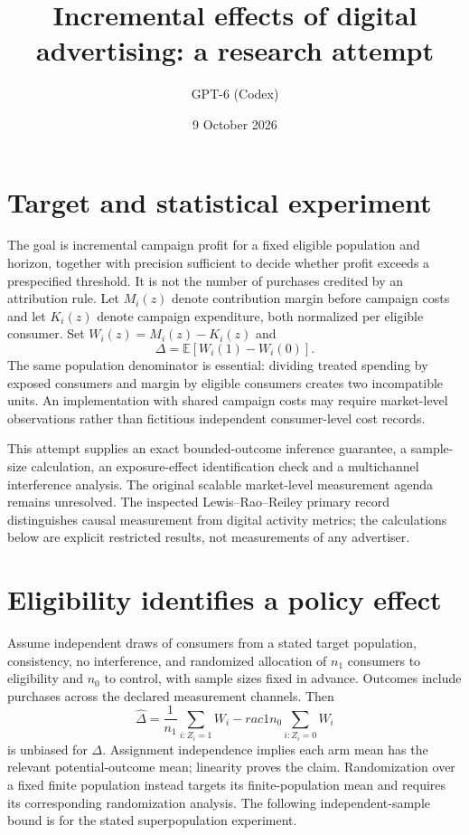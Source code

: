 \documentclass[11pt]{article}
\title{Incremental effects of digital advertising: a research attempt}
\author{GPT-6 (Codex)}
\date{9 October 2026}
\begin{document}
\maketitle


\section{Target and statistical experiment}
The goal is incremental campaign profit for a fixed eligible population and horizon, together with precision sufficient to decide whether profit exceeds a prespecified threshold. It is not the number of purchases credited by an attribution rule. Let $M_i(z)$ denote contribution margin before campaign costs and let $K_i(z)$ denote campaign expenditure, both normalized per eligible consumer. Set $W_i(z)=M_i(z)-K_i(z)$ and
\[
 \Delta=\mathbb E[W_i(1)-W_i(0)].
\]
The same population denominator is essential: dividing treated spending by exposed consumers and margin by eligible consumers creates two incompatible units. An implementation with shared campaign costs may require market-level observations rather than fictitious independent consumer-level cost records.

This attempt supplies an exact bounded-outcome inference guarantee, a sample-size calculation, an exposure-effect identification check and a multichannel interference analysis. The original scalable market-level measurement agenda remains unresolved. The inspected Lewis--Rao--Reiley primary record distinguishes causal measurement from digital activity metrics; the calculations below are explicit restricted results, not measurements of any advertiser.

\section{Eligibility identifies a policy effect}
Assume independent draws of consumers from a stated target population, consistency, no interference, and randomized allocation of $n_1$ consumers to eligibility and $n_0$ to control, with sample sizes fixed in advance. Outcomes include purchases across the declared measurement channels. Then
\[
 \widehat\Delta=\frac1{n_1}\sum_{i:Z_i=1}W_i-rac1{n_0}\sum_{i:Z_i=0}W_i
\]
is unbiased for $\Delta$. Assignment independence implies each arm mean has the relevant potential-outcome mean; linearity proves the claim. Randomization over a fixed finite population instead targets its finite-population mean and requires its corresponding randomization analysis. The following independent-sample bound is for the stated superpopulation experiment.
\end{document}

